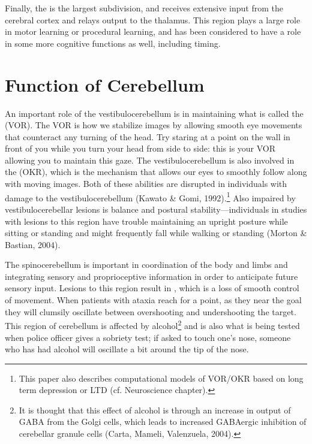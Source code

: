 Finally, the   is the largest subdivision, and receives extensive input from the cerebral cortex and relays output to the thalamus. This region plays a large role in motor learning or procedural learning, and has been considered to have a role in some more cognitive functions as well, including timing. 

 
\section{Function of Cerebellum}
 
An important role of the vestibulocerebellum is in maintaining what is called the  (VOR). The VOR is how we stabilize images by allowing smooth eye movements that counteract any turning of the head. Try staring at a point on the wall in front of you while you turn your head from side to side: this is your VOR allowing you to maintain this gaze. The vestibulocerebellum is also involved in the  (OKR), which is the mechanism that allows our eyes to smoothly follow along with moving images. Both of these abilities are disrupted in individuals with damage to the vestibulocerebellum (Kawato \& Gomi, 1992).\footnote{This paper also describes computational models of VOR/OKR based on long term depression or LTD (cf. Neuroscience chapter).}  Also impaired by vestibulocerebellar lesions is balance and postural stability---individuals in studies with lesions to this region have trouble maintaining an upright posture while sitting or standing and might frequently fall while walking or standing (Morton \& Bastian, 2004).

The spinocerebellum is important in coordination of the body and limbs and integrating sensory and proprioceptive information in order to anticipate future sensory input. Lesions to this region result in , which is a loss of smooth control of movement. When patients with ataxia reach for a point, as they near the goal they will clumsily oscillate between overshooting and undershooting the target. This region of cerebellum is affected by alcohol\footnote{It is thought that this effect of alcohol is through an increase in output of GABA from the Golgi cells, which leads to increased GABAergic inhibition of cerebellar granule cells (Carta, Mameli, Valenzuela, 2004).} and is also what is being tested when police officer gives a sobriety test; if asked to touch one's nose, someone who has had alcohol will oscillate a bit around the tip of the nose. 


